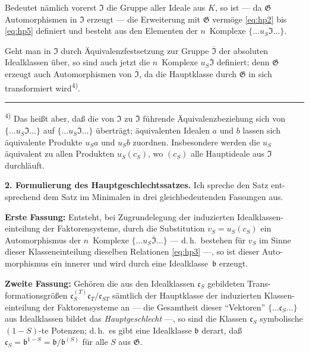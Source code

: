 \documentclass[12pt,a4paper]{article}
\theoremstyle{plain}
\newcommand{\Ga}{\mathfrak{G}}
\begin{document}
Bedeutet n\"amlich vorerst $\mathfrak{I}$ die Gruppe aller Ideale aus $K$, so ist ---
da $\Ga$ Automorphismen in $\mathfrak{I}$ erzeugt --- die Erweiterung mit $\Ga$ verm\"oge \eqref{eq:hp2}
bis \eqref{eq:hp5} definiert und besteht aus den Elementen der $n$~Komplexe
$\{\ldots u_S \mathfrak{I} \ldots\}$.

Geht man in $\mathfrak{I}$ durch \"Aquivalenzfestsetzung zur Gruppe $\overline{\mathfrak{I}}$ der absoluten
Idealklassen \"uber, so sind auch jetzt die $n$~Komplexe $u_S \overline{\mathfrak{I}}$ definiert;
denn $\Ga$ erzeugt auch Automorphismen von $\overline{\mathfrak{I}}$, da die Hauptklasse durch $\Ga$
in sich transformiert wird\textsuperscript{4)}.

\bigskip
\noindent\rule{0.3\textwidth}{0.4pt}

{\small
\textsuperscript{4)} Das hei\ss t aber, da\ss{} die von $\mathfrak{I}$ zu $\overline{\mathfrak{I}}$ f\"uhrende \"Aquivalenzbeziehung sich von
$\{\ldots u_S \mathfrak{I} \ldots\}$ auf $\{\ldots u_S \overline{\mathfrak{I}} \ldots\}$ \"ubertr\"agt; \"aquivalenten Idealen $a$ und $b$ lassen sich
\"aquivalente Produkte $u_S a$ und $u_S b$ zuordnen. Insbesondere werden die $u_S$ \"aquivalent
zu allen Produkten $u_S (c_S)$, wo $(c_S)$ alle Hauptideale aus $\mathfrak{I}$ durchl\"auft.
}


\medskip
\noindent\textbf{2. Formulierung des Hauptgeschlechtssatzes.}\hspace{0.5em}%
Ich spreche den Satz ent-
sprechend dem Satz im Minimalen in drei gleichbedeutenden Fassungen aus.

\smallskip
\noindent\textbf{Erste Fassung:}\hspace{0.5em}%
Entsteht, bei Zugrundelegung der induzierten Idealklassen-
einteilung der Faktorensysteme, durch die Substitution $v_S = u_S (c_S)$ ein
Automorphismus der $n$~Komplexe $\{\ldots u_S \overline{\mathfrak{I}} \ldots\}$ --- d.\,h.\ bestehen f\"ur $v_S$ im
Sinne dieser Klasseneinteilung dieselben Relationen \eqref{eq:hp3} ---, so ist dieser Auto-
morphismus ein innerer und wird durch eine Idealklasse~$\mathfrak{b}$ erzeugt.

\smallskip
\noindent\textbf{Zweite Fassung:}\hspace{0.5em}%
Geh\"oren die aus den Idealklassen $\mathfrak{c}_S$ gebildeten Trans-
formationsgr\"o\ss en $\mathfrak{c}_S^{(T)} \mathfrak{c}_T / \mathfrak{c}_{ST}$ s\"amtlich der Hauptklasse der induzierten Klassen-
einteilung der Faktorensysteme an --- die Gesamtheit dieser ``Vektoren''
$\{\ldots \mathfrak{c}_S \ldots\}$ aus Idealklassen bildet das \emph{Hauptgeschlecht} ---, so sind die
Klassen $\mathfrak{c}_S$ symbolische $(1-S)$-te Potenzen; d.\,h.\ es gibt eine Idealklasse $\mathfrak{b}$
derart, da\ss{} $\mathfrak{c}_S = \mathfrak{b}^{1-S} = \mathfrak{b}/\mathfrak{b}^{(S)}$ f\"ur alle $S$ aus $\Ga$.
\end{document}
